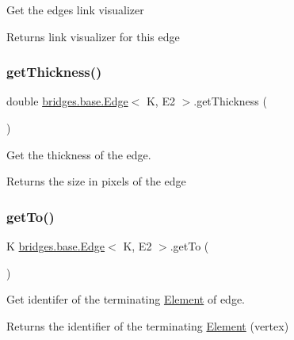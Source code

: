 Get the edge\textquotesingle{}s link visualizer \begin{DoxyReturn}{Returns}
link visualizer for this edge 
\end{DoxyReturn}
\mbox{\label{classbridges_1_1base_1_1_edge_a3431e83235fc5d5dd5cf747ed4853881}} 
\subsubsection{\texorpdfstring{get\+Thickness()}{getThickness()}}
{\footnotesize\ttfamily double \hyperlink{classbridges_1_1base_1_1_edge}{bridges.\+base.\+Edge}$<$ K, E2 $>$.get\+Thickness (\begin{DoxyParamCaption}{ }\end{DoxyParamCaption})}



Get the thickness of the edge. 

\begin{DoxyReturn}{Returns}
the size in pixels of the edge 
\end{DoxyReturn}
\mbox{\label{classbridges_1_1base_1_1_edge_ab451c13aa8173b5ef1cc2b2dd4f8508f}} 
\subsubsection{\texorpdfstring{get\+To()}{getTo()}}
{\footnotesize\ttfamily K \hyperlink{classbridges_1_1base_1_1_edge}{bridges.\+base.\+Edge}$<$ K, E2 $>$.get\+To (\begin{DoxyParamCaption}{ }\end{DoxyParamCaption})}



Get identifer of the terminating \hyperlink{classbridges_1_1base_1_1_element}{Element} of edge. 

\begin{DoxyReturn}{Returns}
the identifier of the terminating \hyperlink{classbridges_1_1base_1_1_element}{Element} (vertex) 
\end{DoxyReturn}
\mbox{\label{classbridges_1_1base_1_1_edge_a77f6d36e94a3cbb8e478c85a1a6dad84}} 
